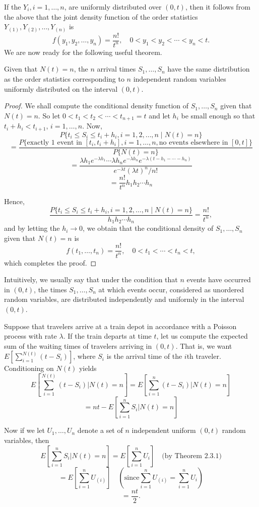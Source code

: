 \documentclass[lang=cn,10pt,thmcnt=section]{elegantbook}
\begin{document}
If the $Y_i, i = 1, \ldots, n$, are uniformly distributed over $(0, t)$, then it follows from the above that the joint density function of the order statistics $Y_{(1)}, Y_{(2)}, \ldots, Y_{(n)}$ is
\[
f(y_1, y_2, \ldots, y_n) = \frac{n!}{t^n}, \quad 0 < y_1 < y_2 < \cdots < y_n < t.
\]
We are now ready for the following useful theorem.
\begin{theorem}
	Given that \( N(t) = n \), the \( n \) arrival times \( S_1, \ldots, S_n \) have the same distribution as the order statistics corresponding to \( n \) independent random variables uniformly distributed on the interval \( (0, t) \).
\end{theorem}
\begin{proof}
	We shall compute the conditional density function of \( S_1, \ldots, S_n \) given that \( N(t) = n \). So let \( 0 < t_1 < t_2 < \cdots < t_{n+1} = t \) and let \( h_i \) be small enough so that \( t_i + h_i < t_{i+1} \), \( i = 1, \ldots, n \). Now,
\[
P\{t_i \leq S_i \leq t_i + h_i, i = 1, 2, \ldots, n \mid N(t) = n\}
\]
\[
= \frac{P\{\text{exactly 1 event in } [t_i, t_i + h_i], i = 1, \ldots, n, \text{no events elsewhere in } [0, t]\}}{P\{N(t) = n\}}
\]
\[
= \frac{\lambda h_1 e^{-\lambda h_1} \cdots \lambda h_n e^{-\lambda h_n} e^{-\lambda (t - h_1 - \cdots - h_n)}}{e^{-\lambda t} (\lambda t)^n / n!}
\]
\[
= \frac{n!}{t^n} h_1 h_2 \cdots h_n
\]

Hence,
\[
\frac{P\{t_i \leq S_i \leq t_i + h_i, i = 1, 2, \ldots, n \mid N(t) = n\}}{h_1 h_2 \cdots h_n} = \frac{n!}{t^n},
\]
and by letting the \( h_i \to 0 \), we obtain that the conditional density of \( S_1, \ldots, S_n \) given that \( N(t) = n \) is
\[
f(t_1, \ldots, t_n) = \frac{n!}{t^n}, \quad 0 < t_1 < \cdots < t_n < t,
\]
which completes the proof.
\end{proof}
\begin{remark}
	Intuitively, we usually say that under the condition that \( n \) events have occurred in \( (0, t) \), the times \( S_1, \ldots, S_n \) at which events occur, considered as unordered random variables, are distributed independently and uniformly in the interval \( (0, t) \).
\end{remark}
\begin{example}
	Suppose that travelers arrive at a train depot in accordance with a Poisson process with rate \(\lambda\). If the train departs at time \( t \), let us compute the expected sum of the waiting times of travelers arriving in \( (0, t) \). That is, we want \( E[\sum_{i=1}^{N(t)} (t - S_i)] \), where \( S_i \) is the arrival time of the \( i \)th traveler. Conditioning on \( N(t) \) yields
\[
E\left[\sum_{i=1}^{N(t)} (t - S_i) \bigg| N(t) = n \right] = E\left[\sum_{i=1}^n (t - S_i) \bigg| N(t) = n \right]
\]
\[
= n t - E\left[\sum_{i=1}^n S_i \bigg| N(t) = n \right]
\]
\end{example}
Now if we let \( U_1, \ldots, U_n \) denote a set of \( n \) independent uniform \( (0, t) \) random variables, then
\[
E\left[\sum_{i=1}^n S_i \bigg| N(t) = n \right] = E\left[\sum_{i=1}^n U_i \right] \quad \text{(by Theorem 2.3.1)}
\]
\[
= E\left[\sum_{i=1}^n U_{(i)} \right] \quad \left(\text{since} \sum_{i=1}^n U_{(i)} = \sum_{i=1}^n U_i \right)
\]
\[
= \frac{n t}{2}.
\]
\end{document}
